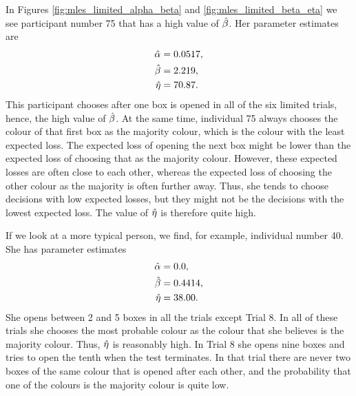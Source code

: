 In Figures \ref{fig:mles_limited_alpha_beta} and \ref{fig:mles_limited_beta_eta} we see participant number 75 that has a high value of $\hat{\beta}$. Her parameter estimates are
\begin{equation}
\label{mles_lim_person75}
    \begin{aligned}
        \hat{\alpha} &= 0.0517,\\
        \hat{\beta} &= 2.219,\\
        \hat{\eta} &= 70.87.
    \end{aligned}
\end{equation}
This participant chooses after one box is opened in all of the six limited trials, hence, the high value of $\hat{\beta}$. At the same time, individual 75 always chooses the colour of that first box as the majority colour, which is the colour with the least expected loss. The expected loss of opening the next box might be lower than the expected loss of choosing that as the majority colour. However, these expected losses are often close to each other, whereas the expected loss of choosing the other colour as the majority is often further away. Thus, she tends to choose decisions with low expected losses, but they might not be the decisions with the lowest expected loss. The value of $\hat{\eta}$ is therefore quite high.

If we look at a more typical person, we find, for example, individual number 40. She has parameter estimates
\begin{equation}
\label{mles_lim_person40}
    \begin{aligned}
        \hat{\alpha} &= 0.0,\\
        \hat{\beta} &= 0.4414,\\
        \hat{\eta} &= 38.00.
    \end{aligned}
\end{equation}
She opens between 2 and 5 boxes in all the trials except Trial 8. In all of these trials she chooses the most probable colour as the colour that she believes is the majority colour. Thus, $\hat{\eta}$ is reasonably high. In Trial 8 she opens nine boxes and tries to open the tenth when the test terminates. In that trial there are never two boxes of the same colour that is opened after each other, and the probability that one of the colours is the majority colour is quite low. 









